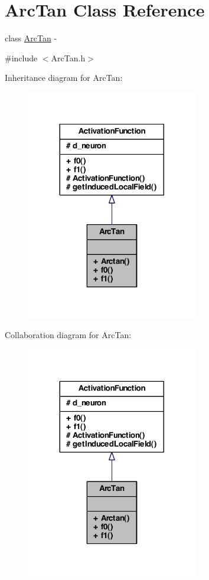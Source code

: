 \hypertarget{class_arc_tan}{
\section{ArcTan Class Reference}
\label{class_arc_tan}
}


class \hyperlink{class_arc_tan}{ArcTan} -\/  




{\ttfamily \#include $<$ArcTan.h$>$}



Inheritance diagram for ArcTan:
\nopagebreak
\begin{figure}[H]
\begin{center}
\leavevmode
\includegraphics[width=212pt]{class_arc_tan__inherit__graph}
\end{center}
\end{figure}


Collaboration diagram for ArcTan:
\nopagebreak
\begin{figure}[H]
\begin{center}
\leavevmode
\includegraphics[width=212pt]{class_arc_tan__coll__graph}
\end{center}
\end{figure}
